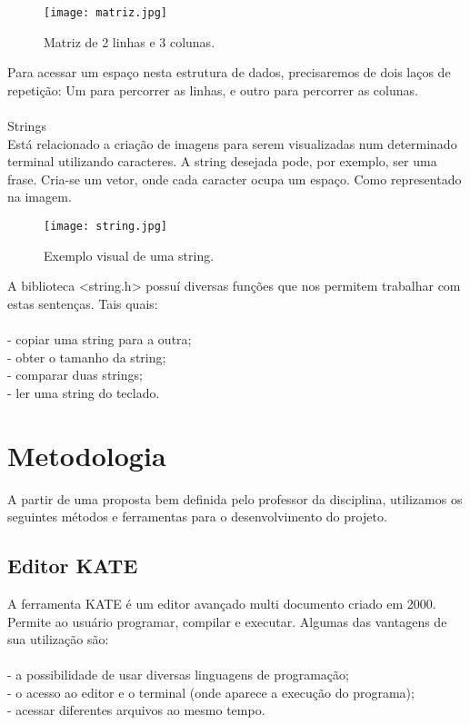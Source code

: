 \documentclass[journal]{IEEEtran}
\begin{document}
\begin{figure}[!htbp]
\centering
\texttt{[image: matriz.jpg]}
\caption{Matriz de 2 linhas e 3 colunas.}
\label{fig:fig_exemple}
\end{figure}

Para acessar um espaço nesta estrutura de dados, precisaremos de dois laços de repetição: Um para percorrer as linhas, e outro para percorrer as colunas.
\\
\\Strings
\\

Está relacionado a criação de imagens para serem visualizadas num determinado terminal utilizando caracteres. A string desejada pode, por exemplo, ser uma frase. Cria-se um vetor, onde cada caracter ocupa um espaço. Como representado na imagem.

\begin{figure}[!htbp]
\centering
\texttt{[image: string.jpg]}
\caption{Exemplo visual de uma string.}
\label{fig:fig_exemple}
\end{figure}

A biblioteca <string.h> possuí diversas funções que nos permitem trabalhar com estas sentenças. Tais quais:
\\
\\- copiar uma string para a outra;
\\- obter o tamanho da string; 
\\- comparar duas strings;
\\- ler uma string do teclado.


\section{Metodologia}
A partir de uma proposta bem definida pelo professor da disciplina, utilizamos os seguintes métodos e ferramentas para o desenvolvimento do projeto.

\subsection{Editor KATE}
A ferramenta KATE é um editor avançado multi documento criado em 2000. Permite ao usuário programar, compilar e executar. Algumas das vantagens de sua utilização são:
\\
\\- a possibilidade de usar diversas linguagens de programação;
\\- o acesso ao editor e o terminal (onde aparece a execução do programa);
\\- acessar diferentes arquivos ao mesmo tempo.
\end{document}
